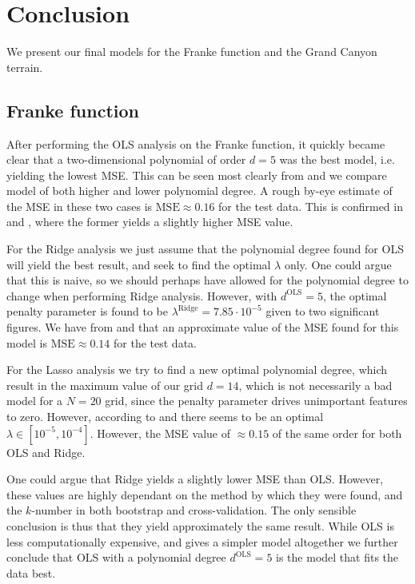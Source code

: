 \section{Conclusion}\label{sec:conclusion}


We present our final models for the Franke function and the Grand Canyon terrain. 


\subsection{Franke function}
 
After performing the OLS analysis on the Franke function, it quickly became clear that a two-dimensional polynomial of order $d=5$ was the best model, i.e. yielding the lowest MSE. This can be seen most clearly from  and  we compare model of both higher and lower polynomial degree. A rough by-eye estimate of the MSE in these two cases is $\mathrm{MSE}\approx 0.16$ for the test data. This is confirmed in  and , where the former yields a slightly higher MSE value. 

For the Ridge analysis we just assume that the polynomial degree found for OLS will yield the best result, and seek to find the optimal $\lambda$ only. One could argue that this is naive, so we should perhaps have allowed for the polynomial degree to change when performing Ridge analysis. However, with $d^\text{OLS}=5$, the optimal penalty parameter is found to be $\lambda^\mathrm{Ridge} = 7.85\cdot10^{-5}$ given to two significant figures. We have from  and  that an approximate value of the MSE found for this model is $\mathrm{MSE} \approx 0.14$ for the test data. 

For the Lasso analysis we try to find a new optimal polynomial degree, which result in the maximum value of our grid $d=14$, which is not necessarily a bad model for a $N=20$ grid, since the penalty parameter drives unimportant features to zero. However, according to  and  there seems to be an optimal $\lambda\in[10^{-5}, 10^{-4}]$. However, the MSE value of $\approx 0.15$ of the same order for both OLS and Ridge. 

One could argue that Ridge yields a slightly lower MSE than OLS. However, these values are highly dependant on the method by which they were found, and the $k$-number in both bootstrap and cross-validation. The only sensible conclusion is thus that they yield approximately the same result. While OLS is less computationally expensive, and gives a simpler model altogether we further conclude that OLS with a polynomial degree $d^\text{OLS}=5$ is the model that fits the data best. 

